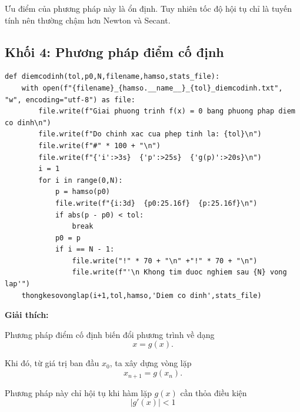 \documentclass{article}
\begin{document}
Ưu điểm của phương pháp này là ổn định. Tuy nhiên tốc độ hội tụ chỉ là tuyến tính nên thường chậm hơn Newton và Secant.

\subsection{Khối 4: Phương pháp điểm cố định}
\begin{lstlisting}[style=mypython,caption={Phương pháp điểm cố định}]
def diemcodinh(tol,p0,N,filename,hamso,stats_file):
    with open(f"{filename}_{hamso.__name__}_{tol}_diemcodinh.txt", "w", encoding="utf-8") as file:
        file.write(f"Giai phuong trinh f(x) = 0 bang phuong phap diem co dinh\n")
        file.write(f"Do chinh xac cua phep tinh la: {tol}\n")
        file.write(f"#" * 100 + "\n")
        file.write(f"{'i':>3s}  {'p':>25s}  {'g(p)':>20s}\n")
        i = 1
        for i in range(0,N):
            p = hamso(p0)
            file.write(f"{i:3d}  {p0:25.16f}  {p:25.16f}\n")
            if abs(p - p0) < tol:
                break
            p0 = p
            if i == N - 1:
                file.write("!" * 70 + "\n" +"!" * 70 + "\n")
                file.write(f"'\n Khong tim duoc nghiem sau {N} vong lap'")
    thongkesovonglap(i+1,tol,hamso,'Diem co dinh',stats_file)
\end{lstlisting}

\textbf{Giải thích:}

Phương pháp điểm cố định biến đổi phương trình về dạng
\[
x=g(x).
\]

Khi đó, từ giá trị ban đầu \(x_0\), ta xây dựng vòng lặp
\[
x_{n+1}=g(x_n).
\]

Phương pháp này chỉ hội tụ khi hàm lặp \(g(x)\) cần thỏa điều kiện
\[
|g'(x)|<1
\]

\end{document}
